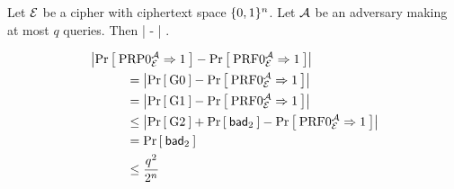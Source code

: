 \begin{figure}


\end{figure}


\begin{figure}


\end{figure}



\begin{lemma} Let ${\cal E}$ be a cipher with ciphertext space $\{0,1\}^n$. 
Let ${\mathcal A}$ be an adversary making at most $q$ queries. Then
\bnm
  \left|  
      -  \right| \le {}  \;.
\enm
\end{lemma}

\begin{align*}
&\left| \Prob{\PRP0_\cipher^\advA\Rightarrow 1} 
      - \Prob{\PRF0_\cipher^\advA\Rightarrow1} \right| \\ 
     &\myInd\myInd\myInd =  \left|\Prob{\G0} - \Prob{\PRF0_\cipher^\advA\Rightarrow1} \right|  \\
     &\myInd\myInd\myInd  =  \left|\Prob{\G1} - \Prob{\PRF0_\cipher^\advA\Rightarrow1} \right|  \\
     &\myInd\myInd\myInd  \le \left|\Prob{\G2} + \Prob{\bad_2} - \Prob{\PRF0_\cipher^\advA\Rightarrow1} \right|\\
     &\myInd\myInd\myInd  = \Prob{\bad_2}\\
     &\myInd\myInd\myInd  \le \frac{q^2}{2^n}\\
\end{align*}

